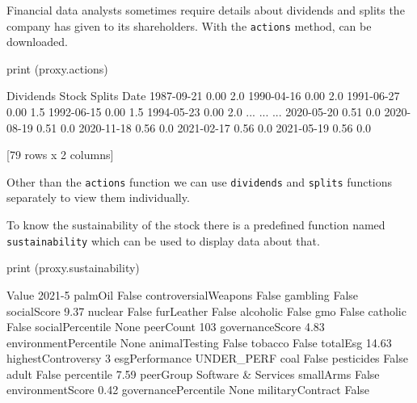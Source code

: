 Financial data analysts sometimes require details about dividends and splits the company has given to its shareholders. With the \texttt{actions} method, can be downloaded.

\begin{ipython}
print (proxy.actions)
\end{ipython}
\begin{ioutput}
            Dividends  Stock Splits
Date                               
1987-09-21       0.00           2.0
1990-04-16       0.00           2.0
1991-06-27       0.00           1.5
1992-06-15       0.00           1.5
1994-05-23       0.00           2.0
...               ...           ...
2020-05-20       0.51           0.0
2020-08-19       0.51           0.0
2020-11-18       0.56           0.0
2021-02-17       0.56           0.0
2021-05-19       0.56           0.0

[79 rows x 2 columns]
\end{ioutput}

Other than the \texttt{actions} function we can use \texttt{dividends} and \texttt{splits} functions separately to view them individually.

To know the sustainability of the stock there is a predefined function named \texttt{sustainability} which can be used to display data about that.

\begin{ipython}
print (proxy.sustainability)
\end{ipython}
\begin{ioutput}
                                     Value
2021-5                                    
palmOil                              False
controversialWeapons                 False
gambling                             False
socialScore                           9.37
nuclear                              False
furLeather                           False
alcoholic                            False
gmo                                  False
catholic                             False
socialPercentile                      None
peerCount                              103
governanceScore                       4.83
environmentPercentile                 None
animalTesting                        False
tobacco                              False
totalEsg                             14.63
highestControversy                       3
esgPerformance                  UNDER_PERF
coal                                 False
pesticides                           False
adult                                False
percentile                            7.59
peerGroup              Software & Services
smallArms                            False
environmentScore                      0.42
governancePercentile                  None
militaryContract                     False
\end{ioutput}

